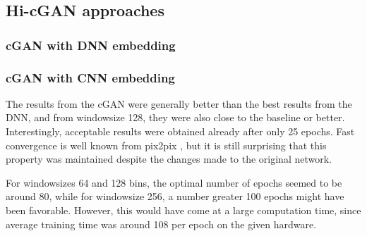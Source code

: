 \subsection{Hi-cGAN approaches} \label{sec:results:cgan}
\subsubsection{cGAN with DNN embedding} \label{sec:results:cgan_dnn}
\subsubsection{cGAN with CNN embedding} \label{sec:results:cgan_cnn}
The results from the cGAN were generally better than the best results from the DNN,
and from windowsize 128, they were also close to the baseline or better.
Interestingly, acceptable results were obtained already after only 25 epochs.
Fast convergence is well known from pix2pix \cite{Isola2017}, but it is still surprising that
this property was maintained despite the changes made to the original network.

For windowsizes 64 and 128 bins, the optimal number of epochs seemed to be around 80,
while for windowsize 256, a number greater 100 epochs might have been favorable.
However, this would have come at a large computation time, 
since average training time was around \SI{108}{\min} per epoch on the given hardware.


